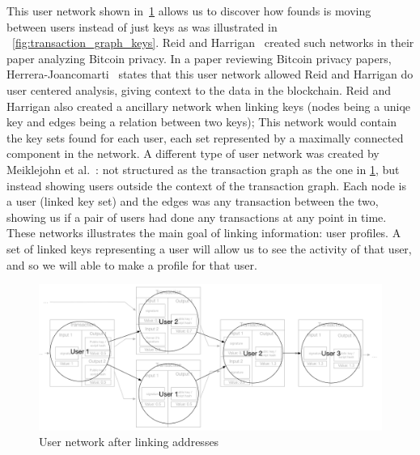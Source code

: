 This user network shown in~\cref{fig:user_graph} allows us to discover how founds is moving between users instead of just keys as was illustrated in ~\cref{fig:transaction_graph_keys}. Reid and Harrigan~\cite{reid2013analysis} created such networks in their paper analyzing Bitcoin privacy. In a paper reviewing Bitcoin privacy papers, Herrera-Joancomarti~\cite{herrera2015research} states that this user network allowed Reid and Harrigan do user centered analysis, giving context to the data in the blockchain. Reid and Harrigan also created a ancillary network when linking keys (nodes being a uniqe key and edges being a relation between two keys); This network would contain the key sets found for each user, each set represented by a maximally connected component in the network. A different type of user network was created by Meiklejohn et al.~\cite{meiklejohn2013fistful}: not structured as the transaction graph as the one in \cref{fig:user_graph}, but instead showing users outside the context of the transaction graph. Each node is a user (linked key set) and the edges was any transaction between the two, showing us if a pair of users had done any transactions at any point in time. These networks illustrates the main goal of linking information: user profiles. A set of linked keys representing a user will allow us to see the activity of that user, and so we will able to make a profile for that user.\\
 
\begin{figure}[ht]
    \centering
    \includegraphics[width=14cm]{figures/usernetwork_related.png}
    \caption{ User network after linking addresses}
    \label{fig:user_graph}
\end{figure}

